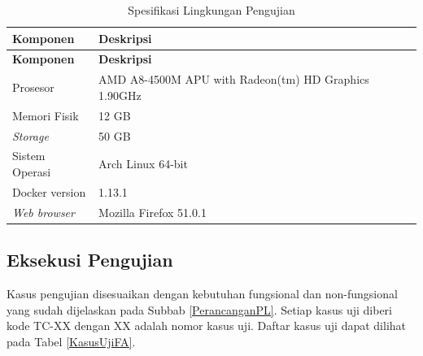\begin{small}
	\begin{longtable}{ | p{3cm} | p{9cm} | }
		\caption{Spesifikasi Lingkungan Pengujian}
		\label{LingPengujian}                                                                 \\ \hline
		\centering\bfseries{Komponen} & \centering\bfseries{Deskripsi} \tabularnewline \hline
		\endfirsthead
		\hline
		\centering\bfseries{Komponen} & \centering\bfseries{Deskripsi} \tabularnewline \hline
		\endhead
		Prosesor                      & AMD A8-4500M APU with Radeon(tm) HD Graphics 1.90GHz  \\ \hline
		Memori Fisik                  & 12 GB                                                 \\ \hline
		\textit{Storage}              & 50 GB                                                 \\ \hline
		Sistem Operasi                & Arch Linux 64-bit                                     \\ \hline
		Docker version                & 1.13.1                                                \\ \hline
		\textit{Web browser}          & Mozilla Firefox 51.0.1                                \\ \hline
	\end{longtable}
\end{small}

\subsection{Eksekusi Pengujian} \label{skenarioujian}
Kasus pengujian disesuaikan dengan kebutuhan fungsional dan non-fungsional yang sudah dijelaskan pada Subbab \ref{PerancanganPL}. Setiap kasus uji diberi kode TC-XX dengan XX adalah nomor kasus uji. Daftar kasus uji dapat dilihat pada Tabel \ref{KasusUjiFA}.

